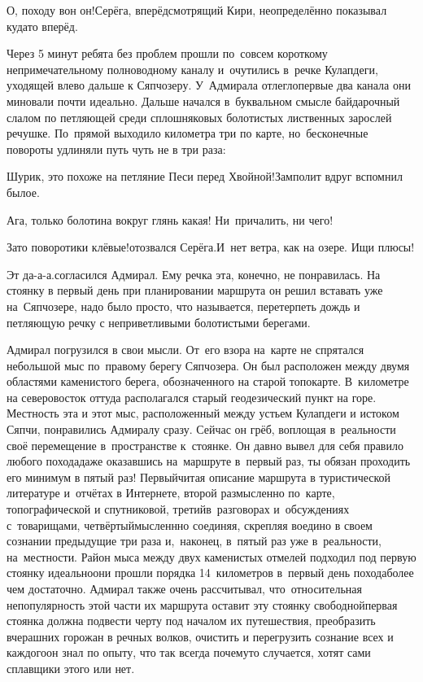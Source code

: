 \diagdash О, походу вон он!\mdash Серёга, вперёдсмотрящий Кири, неопределённо показывал куда\sdash то вперёд.

Через 5 минут ребята без проблем прошли по~совсем короткому непримечательному полноводному каналу и~очутились в~речке Кулапдеги, уходящей влево дальше к Сяпчозеру. У~Адмирала отлегло\mdash первые два канала они миновали почти идеально. Дальше начался в~буквальном смысле байдарочный слалом по петляющей среди сплошняковых болотистых лиственных зарослей речушке. По~прямой выходило километра три по карте, но~бесконечные повороты удлиняли путь чуть не в три раза:

\diagdash Шурик, это похоже на петляние Песи перед Хвойной!\mdash Замполит вдруг вспомнил былое.

\diagdash Ага, только болотина вокруг глянь какая! Ни~причалить, ни чего!

\diagdash Зато поворотики клёвые!\mdash отозвался Серёга.\mdash И~нет ветра, как на озере. Ищи плюсы!

\diagdash Эт да-а-а.\mdash согласился Адмирал. Ему речка эта, конечно, не понравилась. На стоянку в первый день при планировании маршрута  он решил вставать уже на~Сяпчозере, надо было просто, что называется, перетерпеть дождь и петляющую речку с неприветливыми болотистыми берегами. 

Адмирал погрузился в свои мысли. От~его взора на~карте не спрятался небольшой мыс по~правому берегу Сяпчозера. Он был расположен между двумя областями каменистого берега, обозначенного на старой топокарте. В~километре на северо\sdash восток оттуда располагался старый геодезический пункт на горе. Местность эта и этот мыс, расположенный между устьем Кулапдеги и истоком Сяпчи, понравились Адмиралу сразу. Сейчас он грёб, воплощая в~реальности своё перемещение в~пространстве к~стоянке. Он давно вывел для себя правило любого похода\mdash даже оказавшись на~маршруте в~первый раз, ты обязан проходить его минимум в пятый раз! Первый\mdash читая описание маршрута в туристической литературе и~отчётах в Интернете, второй раз\mdash мысленно по~карте, топографической и спутниковой, третий\mdash в~разговорах и~обсуждениях с~товарищами, четвёртый\mdash мысленнно соединяя, скрепляя воедино в своем сознании предыдущие три раза и,~наконец, в~пятый раз уже в~реальности, на~местности. Район мыса между двух каменистых отмелей подходил под первую стоянку идеально\mdash они прошли порядка 14~километров в~первый день похода\mdash более чем достаточно. Адмирал также очень рассчитывал, что~относительная непопулярность этой части их маршрута оставит эту стоянку свободной\mdash первая стоянка должна подвести черту под началом их путешествия, преобразить вчерашних горожан в речных волков, очистить и перегрузить сознание всех и каждого\mdash он знал по опыту, что так всегда почему\sdash то случается, хотят сами сплавщики этого или нет. 

